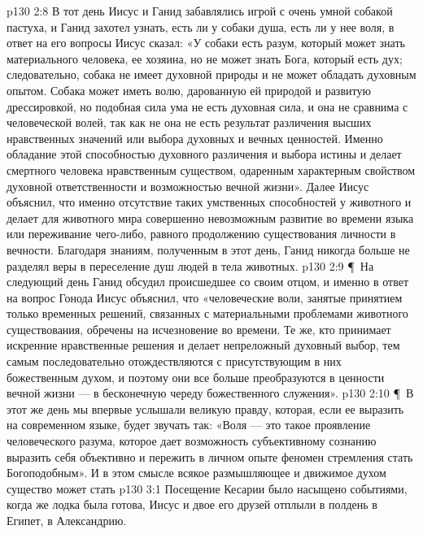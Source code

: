 \vs p130 2:8 В тот день Иисус и Ганид забавлялись игрой с очень умной собакой пастуха, и Ганид захотел узнать, есть ли у собаки душа, есть ли у нее воля, в ответ на его вопросы Иисус сказал: «У собаки есть разум, который может знать материального человека, ее хозяина, но не может знать Бога, который есть дух; следовательно, собака не имеет духовной природы и не может обладать духовным опытом. Собака может иметь волю, дарованную ей природой и развитую дрессировкой, но подобная сила ума не есть духовная сила, и она не сравнима с человеческой волей, так как не  она не есть результат различения высших нравственных значений или выбора духовных и вечных ценностей. Именно обладание этой способностью духовного различения и выбора истины и делает смертного человека нравственным существом, одаренным характерным свойством духовной ответственности и возможностью вечной жизни». Далее Иисус объяснил, что именно отсутствие таких умственных способностей у животного и делает для животного мира совершенно невозможным развитие во времени языка или переживание чего\hyp{}либо, равного продолжению существования личности в вечности. Благодаря знаниям, полученным в этот день, Ганид никогда больше не разделял веры в переселение душ людей в тела животных.
\vs p130 2:9 \P\ На следующий день Ганид обсудил происшедшее со своим отцом, и именно в ответ на вопрос Гонода Иисус объяснил, что «человеческие воли, занятые принятием только временных решений, связанных с материальными проблемами животного существования, обречены на исчезновение во времени. Те же, кто принимает искренние нравственные решения и делает непреложный духовный выбор, тем самым последовательно отождествляются с присутствующим в них божественным духом, и поэтому они все больше преобразуются в ценности вечной жизни --- в бесконечную череду божественного служения».
\vs p130 2:10 \P\ В этот же день мы впервые услышали великую правду, которая, если ее выразить на современном языке, будет звучать так: «Воля --- это такое проявление человеческого разума, которое дает возможность субъективному сознанию выразить себя объективно и пережить в личном опыте феномен стремления стать Богоподобным». И в этом смысле всякое размышляющее и движимое духом существо может стать 
\vs p130 3:1 Посещение Кесарии было насыщено событиями, когда же лодка была готова, Иисус и двое его друзей отплыли в полдень в Египет, в Александрию.
